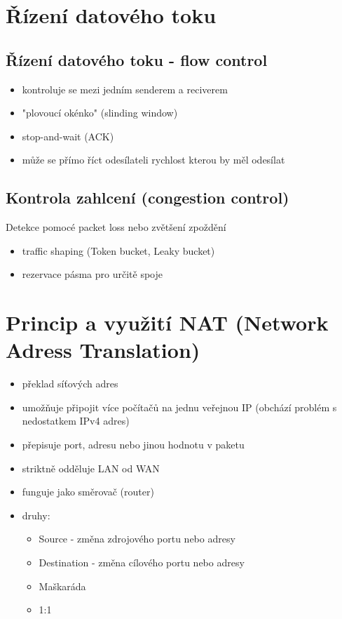 \documentclass{szzclass}
\providecommand{\tightlist}{%
  \setlength{\itemsep}{0pt}\setlength{\parskip}{0pt}}
\begin{document}
\hypertarget{ux159uxedzenuxed-datovuxe9ho-toku}{%
\section{Řízení datového
toku}\label{ux159uxedzenuxed-datovuxe9ho-toku}}
\subsection{Řízení datového toku - flow control}
\begin{itemize}
  \item kontroluje se mezi jedním senderem a reciverem
  \item "plovoucí okénko" (slinding window)
  \item stop-and-wait (ACK)
  \item může se přímo říct odesílateli rychlost kterou by měl odesílat
\end{itemize}
\subsection{Kontrola zahlcení (congestion control)}
Detekce pomocé packet loss nebo zvětšení zpoždění
\begin{itemize}
  \item traffic shaping (Token bucket, Leaky bucket)
  \item rezervace pásma pro určitě spoje
\end{itemize}

\hypertarget{princip-a-vyuux17eituxed-nat-network-adress-translation}{%
\section{Princip a využití NAT (Network Adress
Translation)}\label{princip-a-vyuux17eituxed-nat-network-adress-translation}}

\begin{itemize}
\tightlist
\item
  překlad síťových adres
\item
  umožňuje připojit více počítačů na jednu veřejnou IP (obchází problém
  s nedostatkem IPv4 adres)
\item
  přepisuje port, adresu nebo jinou hodnotu v paketu
\item 
  striktně odděluje LAN od WAN
\item 
  funguje jako směrovač (router)
\item
  druhy:

  \begin{itemize}
  \tightlist
  \item
    Source - změna zdrojového portu nebo adresy
  \item
    Destination - změna cílového portu nebo adresy
  \item
    Maškaráda
  \item
    1:1
  \end{itemize}
\end{itemize}
\end{document}
